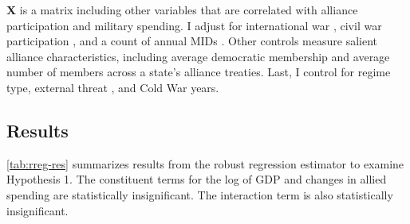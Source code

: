 \documentclass[12pt]{article}
\begin{document}
\textbf{X} is a matrix including other variables that are correlated with alliance participation and military spending. 
I adjust for international war \citep{Reiteretal2016}, civil war participation \citep{SarkeesWayman2010}, and a count of annual MIDs \citep{Gibleretal2016}. 
Other controls measure salient alliance characteristics, including average democratic membership \citep{DigiuseppePoast2016} and average number of members across a state's alliance treaties.   
Last, I control for regime type, external threat \citep{LeedsSavun2007}, and Cold War years. 


\subsection{Results}

 
\autoref{tab:rreg-res} summarizes results from the robust regression estimator to examine Hypothesis 1. 
The constituent terms for the log of GDP and changes in allied spending are statistically insignificant. 
The interaction term is also statistically insignificant. 
\end{document}
